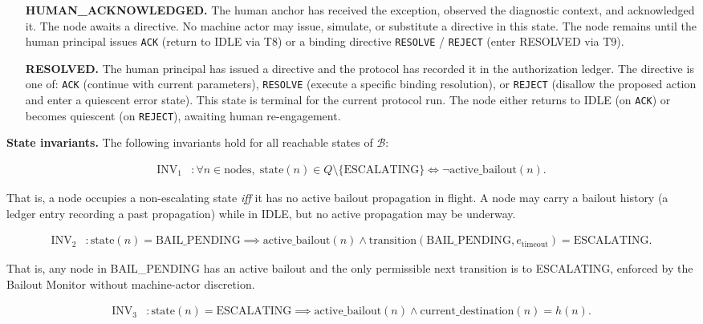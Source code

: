 \begin{itemize}
\item[\textbf{HUMAN\_ACKNOWLEDGED.}] The human anchor has received the exception, observed the diagnostic context, and acknowledged it. The node awaits a directive. No machine actor may issue, simulate, or substitute a directive in this state. The node remains until the human principal issues \texttt{ACK} (return to IDLE via T8) or a binding directive \texttt{RESOLVE} / \texttt{REJECT} (enter RESOLVED via T9).

\item[\textbf{RESOLVED.}] The human principal has issued a directive and the protocol has recorded it in the authorization ledger. The directive is one of: \texttt{ACK} (continue with current parameters), \texttt{RESOLVE} (execute a specific binding resolution), or \texttt{REJECT} (disallow the proposed action and enter a quiescent error state). This state is terminal for the current protocol run. The node either returns to IDLE (on \texttt{ACK}) or becomes quiescent (on \texttt{REJECT}), awaiting human re-engagement.
\end{itemize}

\bigskip
\noindent\textbf{State invariants.} The following invariants hold for all reachable states of $\mathcal{B}$:

\begin{align}
\text{INV}_1 &: \forall n \in \text{nodes},\; \text{state}(n) \in Q \setminus \{\text{ESCALATING}\} \iff \neg\text{active\_bailout}(n). \tag{INV-1}
\end{align}

That is, a node occupies a non-escalating state \emph{iff} it has no active bailout propagation in flight. A node may carry a bailout history (a ledger entry recording a past propagation) while in IDLE, but no active propagation may be underway.

\begin{align}
\text{INV}_2 &: \text{state}(n) = \text{BAIL\_PENDING} \implies \text{active\_bailout}(n) \land \text{transition}(\text{BAIL\_PENDING}, e_{\text{timeout}}) = \text{ESCALATING}. \tag{INV-2}
\end{align}

That is, any node in BAIL\_PENDING has an active bailout and the only permissible next transition is to ESCALATING, enforced by the Bailout Monitor without machine-actor discretion.

\begin{align}
\text{INV}_3 &: \text{state}(n) = \text{ESCALATING} \implies \text{active\_bailout}(n) \land \text{current\_destination}(n) = h(n). \tag{INV-3}
\end{align}

